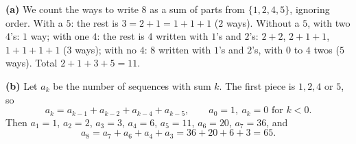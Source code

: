 \textbf{(a)} We count the ways to write $8$ as a sum of parts from $\{1,2,4,5\}$, ignoring order. With a $5$: the rest is $3=2+1=1+1+1$ ($2$ ways). Without a $5$, with two $4$'s: $1$ way; with one $4$: the rest is $4$ written with $1$'s and $2$'s: $2+2$, $2+1+1$, $1+1+1+1$ ($3$ ways); with no $4$: $8$ written with $1$'s and $2$'s, with $0$ to $4$ twos ($5$ ways). Total $2+1+3+5=\boxed{11}$.

\textbf{(b)} Let $a_k$ be the number of sequences with sum $k$. The first piece is $1,2,4$ or $5$, so
\[a_k=a_{k-1}+a_{k-2}+a_{k-4}+a_{k-5},\qquad a_0=1,\ a_k=0\text{ for }k<0.\]
Then $a_1=1$, $a_2=2$, $a_3=3$, $a_4=6$, $a_5=11$, $a_6=20$, $a_7=36$, and
\[a_8=a_7+a_6+a_4+a_3=36+20+6+3=\boxed{65}.\]
